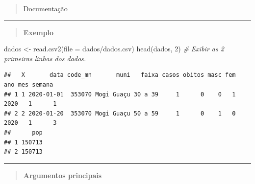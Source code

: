 \documentclass[
]{book}
\newenvironment{Shaded}{\begin{snugshade}}{\end{snugshade}}
\newcommand{\AttributeTok}[1]{\textcolor[rgb]{0.77,0.63,0.00}{#1}}
\newcommand{\CommentTok}[1]{\textcolor[rgb]{0.56,0.35,0.01}{\textit{#1}}}
\newcommand{\DecValTok}[1]{\textcolor[rgb]{0.00,0.00,0.81}{#1}}
\newcommand{\FunctionTok}[1]{\textcolor[rgb]{0.00,0.00,0.00}{#1}}
\newcommand{\NormalTok}[1]{#1}
\newcommand{\OtherTok}[1]{\textcolor[rgb]{0.56,0.35,0.01}{#1}}
\newcommand{\StringTok}[1]{\textcolor[rgb]{0.31,0.60,0.02}{#1}}
\theoremstyle{definition}
\theoremstyle{definition}
\theoremstyle{definition}
\theoremstyle{definition}
\theoremstyle{remark}
\begin{document}
\begin{quote}
\href{https://www.rdocumentation.org/packages/utils/versions/3.6.2/topics/read.table}{Documentação}
\end{quote}

\begin{center}\rule{0.5\linewidth}{0.5pt}\end{center}

\begin{quote}
\textbf{Exemplo}
\end{quote}

\begin{Shaded}
\begin{Highlighting}[]
\NormalTok{dados }\OtherTok{\textless{}{-}} \FunctionTok{read.csv2}\NormalTok{(}\AttributeTok{file =} \StringTok{\textquotesingle{}dados/dados.csv\textquotesingle{}}\NormalTok{)}
\FunctionTok{head}\NormalTok{(dados, }\DecValTok{2}\NormalTok{)          }\CommentTok{\# Exibir as 2 primeiras linhas dos dados.}
\end{Highlighting}
\end{Shaded}

\begin{verbatim}
##   X       data code_mn       muni   faixa casos obitos masc fem  ano mes semana
## 1 1 2020-01-01  353070 Mogi Guaçu 30 a 39     1      0    0   1 2020   1      1
## 2 2 2020-01-20  353070 Mogi Guaçu 50 a 59     1      0    1   0 2020   1      3
##      pop
## 1 150713
## 2 150713
\end{verbatim}

\begin{center}\rule{0.5\linewidth}{0.5pt}\end{center}

\begin{quote}
\textbf{Argumentos principais}
\end{quote}
\end{document}
